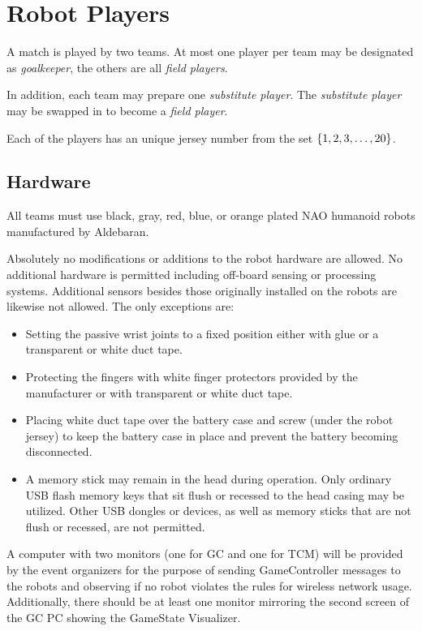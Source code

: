 \section{Robot Players}
\label{sec:robot_players}
A match is played by two teams.  At most one player per team may be designated as \emph{goalkeeper}, the others are all \emph{field players}.

In addition, each team may prepare one \emph{substitute player}. The \emph{substitute player} may be swapped in to become a \emph{field player}.

Each of the players has an unique jersey number from the set $\{1, 2, 3, \ldots, 20\}$.

\subsection{Hardware}
\label{sec:hardware}
All teams must use black, gray, red, blue, or orange plated NAO humanoid robots manufactured by Aldebaran.

Absolutely no modifications or additions to the robot hardware are allowed. No additional hardware is permitted including off-board sensing or processing systems. Additional sensors besides those originally installed on the robots are likewise not allowed. The only exceptions are:

\begin{itemize}
    \item Setting the passive wrist joints to a fixed position either with glue or a transparent or white duct tape.
    \item Protecting the fingers with white finger protectors provided by the manufacturer or with transparent or white duct tape.
    \item Placing white duct tape over the battery case and screw (under the robot jersey) to keep the battery case in place and prevent the battery becoming disconnected.
    \item A memory stick may remain in the head during operation.  Only ordinary USB flash memory keys that sit flush or recessed to the head casing may be utilized. Other USB dongles or devices, as well as memory sticks that are not flush or recessed, are not permitted.
\end{itemize}

A computer with two monitors (one for GC and one for TCM) will be provided by the event organizers for the purpose of sending GameController messages to the robots and observing if no robot violates the rules for wireless network usage.
Additionally, there should be at least one monitor mirroring the second screen of the GC PC showing the GameState Visualizer.

